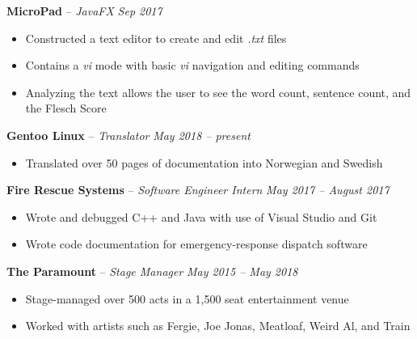 \documentclass[11pt,letterpaper]{article}
\begin{document}

\headedsection 
{\textbf{MicroPad} -- \textit{JavaFX}}
{\textit{Sep 2017}} {
		\begin{itemize}[noitemsep,nolistsep]
	\item Constructed a text editor to create and edit \textit{.txt} files
	\item Contains a \textit{vi} mode with basic \textit{vi} navigation and editing commands
	\item Analyzing the text allows the user to see the word count, sentence count, and the Flesch Score
\end{itemize}
}


\spacedhrule{0.2em}{-0.8em} 



\headedsection
{\textbf{Gentoo Linux} -- \textit{Translator}}
{\textit{May 2018 -- present}} {
	\begin{itemize}[noitemsep,nolistsep]
		\item Translated over 50 pages of documentation into Norwegian and Swedish
	\end{itemize}
}


\headedsection 
{\textbf{Fire Rescue Systems} -- \textit{Software Engineer Intern}}
{\textit{May 2017 -- August 2017}} {
	\begin{itemize}[noitemsep,nolistsep]
		\item Wrote and debugged C++ and Java with use of Visual Studio and Git
		\item Wrote code documentation for emergency-response dispatch software
	\end{itemize}
}


\headedsection 
{\textbf{The Paramount} -- \textit{Stage Manager}}
{\textit{May 2015 -- May 2018}} {
	\begin{itemize}[noitemsep,nolistsep]
		\item Stage-managed over 500 acts in a 1,500 seat entertainment venue
		\item Worked with artists such as Fergie, Joe Jonas, Meatloaf, Weird Al, and Train
	\end{itemize}
}
\end{document}
